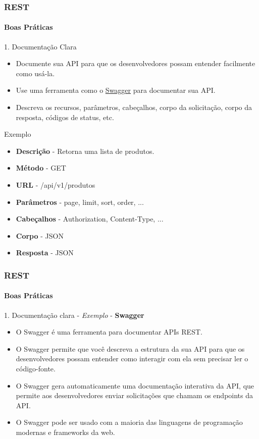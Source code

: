 \documentclass[
	9pt, %
	t, %
]{beamer}
\begin{document}
\begin{frame}
	\frametitle{REST}
	\framesubtitle{Boas Práticas}

	\begin{block}{1. Documentação Clara}
		\begin{itemize}
			\item Documente sua API para que os desenvolvedores possam entender facilmente como
			      usá-la.
			\item Use uma ferramenta como o \href{https://swagger.io/}{Swagger} para documentar
			      sua API.
			\item Descreva os recursos, parâmetros, cabeçalhos, corpo da solicitação, corpo da
			      resposta, códigos de status, etc.
		\end{itemize}
	\end{block}

	\begin{exampleblock}{Exemplo}
		\begin{itemize}
			\item \textbf{Descrição} - Retorna uma lista de produtos.
			\item \textbf{Método} - GET
			\item \textbf{URL} - /api/v1/produtos
			\item \textbf{Parâmetros} - page, limit, sort, order, ...
			\item \textbf{Cabeçalhos} - Authorization, Content-Type, ...
			\item \textbf{Corpo} - JSON
			\item \textbf{Resposta} - JSON
		\end{itemize}
	\end{exampleblock}

\end{frame}

\begin{frame}
	\frametitle{REST}
	\framesubtitle{Boas Práticas}

	\begin{block}{1. Documentação clara - \textit{Exemplo} - \textbf{Swagger}}
		\begin{itemize}
			\item O Swagger é uma ferramenta para documentar APIs REST.
			\item O Swagger permite que você descreva a estrutura da sua API para que os
			      desenvolvedores possam entender como interagir com ela sem precisar ler o
			      código-fonte.
			\item O Swagger gera automaticamente uma documentação interativa da API, que permite
			      aos desenvolvedores enviar solicitações que chamam os endpoints da API.
			\item O Swagger pode ser usado com a maioria das linguagens de programação modernas e
			      frameworks da web.
		\end{itemize}
	\end{block}

\end{frame}
\end{document}
